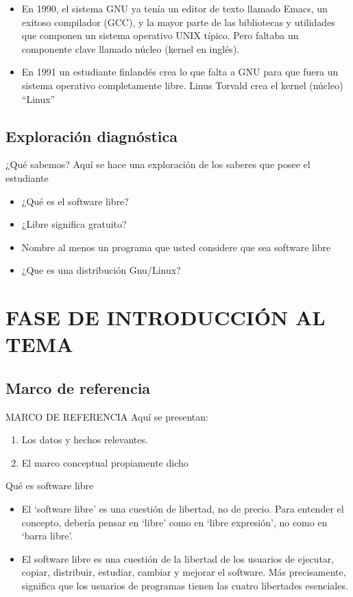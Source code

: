 \documentclass{beamer}
\begin{document}
 \begin{frame}
 \begin{itemize}
  \item En 1990, el sistema GNU ya tenía un editor de texto llamado Emacs, un exitoso compilador (GCC), y la mayor parte de las bibliotecas y utilidades que componen un sistema operativo UNIX típico. Pero faltaba un componente clave llamado núcleo (kernel en inglés).
\pause
  \item En 1991 un estudiante finlandés crea lo que falta a GNU para que fuera un sistema operativo completamente libre. Linus Torvald crea el kernel (núcleo) ``Linux''
\end{itemize}
\end{frame}

\subsection{Exploración diagnóstica}
\begin{frame}{¿Qué sabemos?}
Aquí se hace una exploración de los saberes que posee el estudiante
\begin{itemize}
  \item  ¿Qué es el software libre?
  \item ¿Libre significa gratuito?
  \item Nombre al menos un programa que usted considere que sea software libre
  \item ¿Que es una distribución Gnu/Linux?
\end{itemize}
\end{frame}

\section{FASE DE INTRODUCCIÓN AL TEMA}
\subsection{Marco de referencia}
\begin{frame}{MARCO DE REFERENCIA}
  Aquí se presentan:
  \begin{enumerate}
    \item Los datos y hechos relevantes.\pause
    \item El marco conceptual propiamente dicho
  \end{enumerate}
\end{frame}

\begin{frame}{Qué es software libre}
  \begin{itemize}
    \item El `software libre' es una cuestión de libertad, no de precio. Para entender el concepto, debería pensar en `libre' como en `libre expresión', no como en `barra libre'.\pause
    \item El software libre es una cuestión de la libertad de los usuarios de ejecutar, copiar, distribuir, estudiar, cambiar y mejorar el software. Más precisamente, significa que los usuarios de programas tienen las cuatro libertades esenciales.
  \end{itemize}
  \end{frame}
\end{document}

